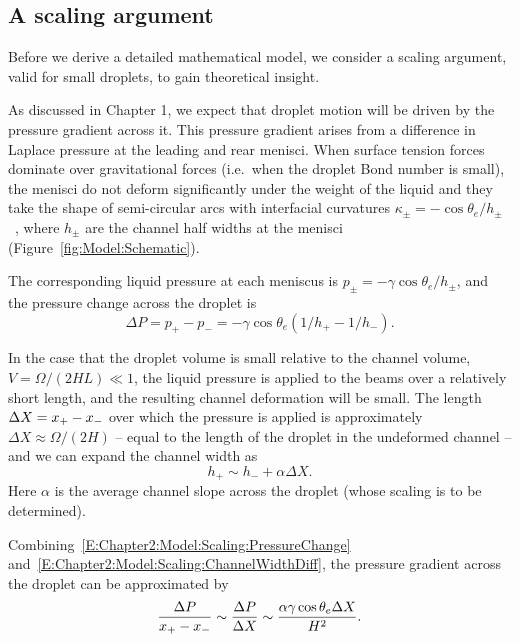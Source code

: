 \subsection{A scaling argument}\label{S:Model:Scaling}
Before we derive a detailed mathematical model, we consider a scaling argument, valid for small droplets, to gain theoretical insight.

As discussed in Chapter 1, we expect that droplet motion will be driven by the pressure gradient across it. This pressure gradient arises from a difference in Laplace pressure at the leading and rear menisci. When surface tension forces dominate over gravitational forces (i.e.~when the droplet Bond number is small), the menisci do not deform significantly under the weight of the liquid and they take the shape of semi-circular arcs with interfacial curvatures $\kappa_{\pm} = -\cos \theta_e/h_{\pm}$~\citep{deGennes2004}, where $h_{\pm}$ are the channel half widths at the menisci (Figure~\ref{fig:Model:Schematic}).

The corresponding liquid pressure at each meniscus is $p_{\pm} = -\gamma  \cos \theta_e/h_{\pm}$, and the pressure change across the droplet is
\begin{equation}\label{E:Chapter2:Model:Scaling:PressureChange}
\Delta P = p_{+} - p_{-} = -\gamma \cos \theta_e(1/h_{+} - 1/h_{-}).
\end{equation}

In the case that the droplet volume is small relative to the channel volume, $V = \Omega / (2HL) \ll 1$, the liquid pressure is applied to the beams over a relatively short length, and the resulting channel deformation will be small. The length $\Delta X = x_{+} - x_{-}$ over which the pressure is applied is approximately $\Delta X \approx \Omega/(2H)$ -- equal to the length of the droplet in the undeformed channel -- and we can expand the channel width as
\begin{equation}\label{E:Chapter2:Model:Scaling:ChannelWidthDiff}
h_+ \sim h_- + \alpha \Delta X.
\end{equation}
Here $\alpha$ is the average channel slope across the droplet (whose scaling is to be determined).

Combining~\eqref{E:Chapter2:Model:Scaling:PressureChange} and~\eqref{E:Chapter2:Model:Scaling:ChannelWidthDiff}, the pressure gradient across the droplet can be approximated by
\begin{equation}\label{E:Chapter2:Model:Scaling:PressureChangeExpanded}
\frac{\Delta P}{x_{+} -  x_{-}} \sim  \frac{\Delta P}{\Delta X} \sim \frac{ \alpha \gamma \cos \theta_e \Delta X }{H^2}.
\end{equation}

